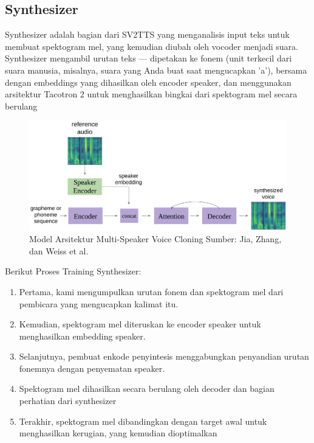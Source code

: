 \subsection{Synthesizer}
Synthesizer adalah bagian dari SV2TTS yang menganalisis input teks untuk membuat spektogram mel, yang kemudian diubah oleh vocoder menjadi suara.
Synthesizer mengambil urutan teks — dipetakan ke fonem (unit terkecil dari suara manusia, misalnya, suara yang Anda buat saat mengucapkan 'a'), bersama dengan embeddings yang dihasilkan oleh encoder speaker, dan menggunakan arsitektur Tacotron 2 untuk menghasilkan bingkai dari spektogram mel secara berulang
\begin{figure}[H]
        \centerline{\includegraphics[scale=.35]{figures/model}}
        \caption{Model Arsitektur Multi-Speaker Voice Cloning Sumber: Jia, Zhang, dan Weiss et al.}
		\label{model}
\end{figure}

Berikut Proses Training Synthesizer:

\begin{enumerate}
\item Pertama, kami mengumpulkan urutan fonem dan spektogram mel dari pembicara yang mengucapkan kalimat itu.
\item Kemudian, spektogram mel diteruskan ke encoder speaker untuk menghasilkan embedding speaker.
\item Selanjutnya, pembuat enkode penyintesis menggabungkan penyandian urutan fonemnya dengan penyematan speaker.
\item Spektogram mel dihasilkan secara berulang oleh decoder dan bagian perhatian dari synthesizer
\item Terakhir, spektogram mel dibandingkan dengan target awal untuk menghasilkan kerugian, yang kemudian dioptimalkan
\end{enumerate}

